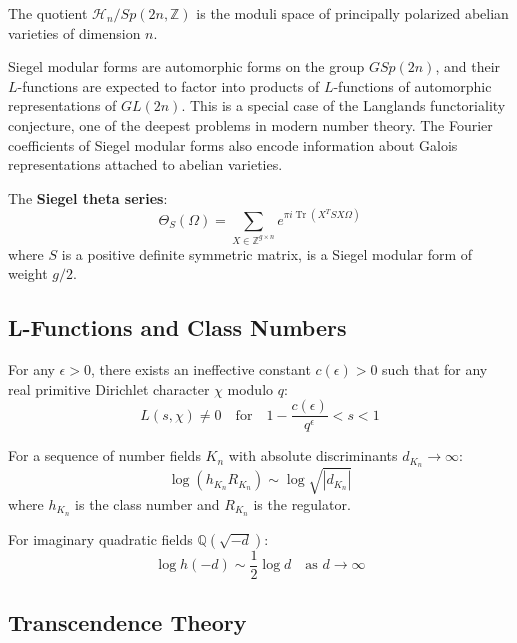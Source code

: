 The quotient $\mathcal{H}_n/Sp(2n,\mathbb{Z})$ is the moduli space of principally polarized abelian varieties of dimension $n$.

\begin{remark}
Siegel modular forms are automorphic forms on the group $GSp(2n)$, and their $L$-functions are expected to factor into products of $L$-functions of automorphic representations of $GL(2n)$. This is a special case of the Langlands functoriality conjecture, one of the deepest problems in modern number theory. The Fourier coefficients of Siegel modular forms also encode information about Galois representations attached to abelian varieties.
\end{remark}

\begin{example}
The \textbf{Siegel theta series}:
\[
\Theta_S(\Omega) = \sum_{X \in \mathbb{Z}^{g \times n}} e^{\pi i \operatorname{Tr}(X^T S X \Omega)}
\]
where $S$ is a positive definite symmetric matrix, is a Siegel modular form of weight $g/2$.
\end{example}

\subsection{L-Functions and Class Numbers}

\begin{theorem}
For any $\epsilon > 0$, there exists an ineffective constant $c(\epsilon) > 0$ such that for any real primitive Dirichlet character $\chi$ modulo $q$:
\[
L(s,\chi) \neq 0 \quad \text{for} \quad 1 - \frac{c(\epsilon)}{q^\epsilon} < s < 1
\]
\end{theorem}

\begin{theorem}
For a sequence of number fields $K_n$ with absolute discriminants $d_{K_n} \to \infty$:
\[
\log(h_{K_n} R_{K_n}) \sim \log\sqrt{|d_{K_n}|}
\]
where $h_{K_n}$ is the class number and $R_{K_n}$ is the regulator.
\end{theorem}

For imaginary quadratic fields $\mathbb{Q}(\sqrt{-d})$:
\[
\log h(-d) \sim \frac{1}{2}\log d \quad \text{as } d \to \infty
\]

\subsection{Transcendence Theory}

